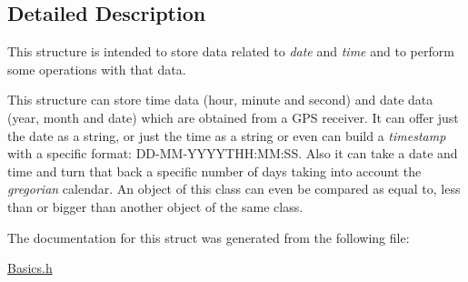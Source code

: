 \subsection{Detailed Description}
This structure is intended to store data related to {\itshape date} and {\itshape time} and to perform some operations with that data. 

This structure can store time data (hour, minute and second) and date data (year, month and date) which are obtained from a G\+PS receiver. It can offer just the date as a string, or just the time as a string or even can build a {\itshape timestamp} with a specific format\+: D\+D-\/\+M\+M-\/\+Y\+Y\+Y\+Y\+T\+HH\+:MM\+:SS. Also it can take a date and time and turn that back a specific number of days taking into account the {\itshape gregorian} calendar. An object of this class can even be compared as equal to, less than or bigger than another object of the same class. 

The documentation for this struct was generated from the following file\+:\begin{DoxyCompactItemize}
\item 
\hyperlink{Basics_8h}{Basics.\+h}\end{DoxyCompactItemize}
